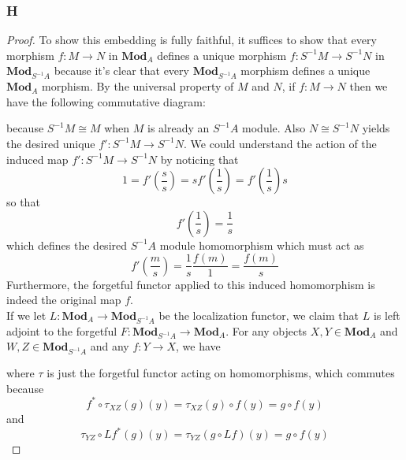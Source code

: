 \documentclass{article}
\DeclareMathOperator{\Hom}{Hom}
\newcommand{\Mod}{\mathbf{Mod}} %
\begin{document}
\subsubsection{H}\label{1.5.H}
\begin{proof}
    To show this embedding is fully faithful, it suffices to show that every morphism $f:M\to N$ in $\Mod_A$ defines a unique morphism $f:S^{-1}M\to S^{-1}N$ in $\Mod_{S^{-1}A}$ because it's clear that every $\Mod_{S^{-1}A}$ morphism defines a unique $\Mod_A$ morphism. By the universal property of $M$ and $N$, if $f:M\to N$ then we have the following commutative diagram:
    \begin{center}
    \end{center}
    because $S^{-1}M\cong M$ when $M$ is already an $S^{-1}A$ module. Also $N\cong S^{-1}N$ yields the desired unique $f':S^{-1}M\to S^{-1}N$.
    We could understand the action of the induced map $f':S^{-1}M\to S^{-1}N$ by noticing that
    \[
    1=f'(\frac{s}{s})=sf'(\frac{1}{s})=f'(\frac{1}{s})s
    \]
    so that
    \[
    f'(\frac{1}{s})=\frac{1}{s}
    \]
    which defines the desired $S^{-1}A$ module homomorphism which must act as
    \[
    f'(\frac{m}{s})=\frac{1}{s}\frac{f(m)}{1}=\frac{f(m)}{s}
    \]
    Furthermore, the forgetful functor applied to this induced homomorphism is indeed the original map $f$.\\
    If we let $L:\Mod_A\to \Mod_{S^{-1}A}$ be the localization functor, we claim that $L$ is left adjoint to the forgetful $F:\Mod_{S^{-1}A}\to \Mod_A$. For any objects $X,Y\in \Mod_A$ and $W,Z\in \Mod_{S^{-1}A}$ and any $f:Y\to X$, we have
    \begin{center}
    \end{center}
    where $\tau$ is just the forgetful functor acting on homomorphisms, which commutes because
    \[
    f^*\circ \tau_{XZ}(g)(y)=\tau_{XZ}(g)\circ f(y)=g\circ f(y)
    \]
    and
    \[
    \tau_{YZ}\circ Lf^*(g)(y)=\tau_{YZ}(g\circ Lf)(y)=g\circ f(y)
\]
\end{proof}
\end{document}
